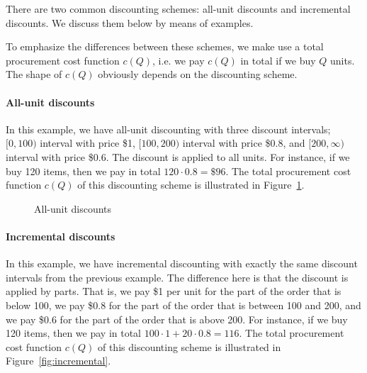 \begin{solution}
There are two common discounting schemes: all-unit discounts and incremental discounts. We discuss them below by means of examples. 

To emphasize the differences between these schemes, we make use a total procurement cost function $c(Q)$, i.e. we pay $c(Q)$ in total if we buy $Q$ units. The shape of $c(Q)$ obviously depends on the discounting scheme.

\paragraph{All-unit discounts} In this example, we have all-unit discounting with three discount intervals; $[0,100)$ interval with price \$1, $[100,200)$ interval with price \$0.8, and $[200,\infty)$ interval with price \$0.6. The discount is applied to all units. For instance, if we buy 120 items, then we pay in total $120\cdot 0.8=\$96$. The total procurement cost function $c(Q)$ of this discounting scheme is illustrated in Figure~\ref{fig:allunit}.

\begin{figure}[htbp]
\centering
{}
\caption{All-unit discounts}
\label{fig:allunit}
\end{figure}


\paragraph{Incremental discounts} In this example, we have incremental discounting with exactly the same discount intervals from the previous example. The difference here is that the discount is applied by parts. That is, we pay \$1 per unit for the part of the order that is below 100, we pay \$0.8 for the part of the order that is between 100 and 200, and we pay \$0.6 for the part of the order that is above 200. For instance, if we buy 120 items, then we pay in total $100\cdot 1 + 20 \cdot 0.8=116$. The total procurement cost function $c(Q)$ of this discounting scheme is illustrated in Figure~\ref{fig:incremental}.


\end{solution}
